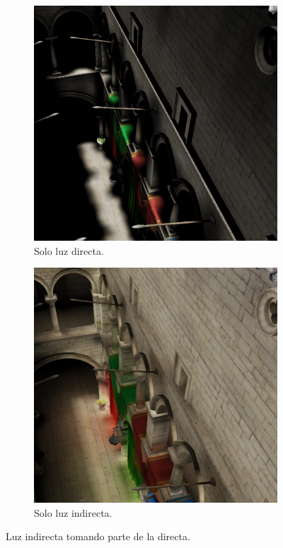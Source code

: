\begin{figure}[h]
    \begin{center}
    \begin{subfigure}{.49\textwidth}
        \includegraphics[width=\textwidth]{indirect-grabs-direct-1.png}
        \caption{Solo luz directa.}
    \end{subfigure}
    \begin{subfigure}{.49\textwidth}
        \includegraphics[width=\textwidth]{indirect-grabs-direct-2.png}
        \caption{Solo luz indirecta.}
    \end{subfigure}
    \caption{Luz indirecta tomando parte de la directa.}
    \label{fig:indirect-grabs-direct}
    \end{center}
\end{figure}

